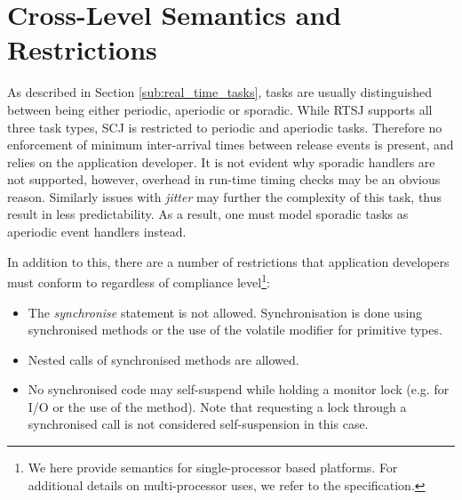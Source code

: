 \section{Cross-Level Semantics and Restrictions} %
\label{sub:cross_level_restrictions}
As described in Section \ref{sub:real_time_tasks}, tasks are usually distinguished between being either periodic, aperiodic or sporadic. While RTSJ supports all three task types, SCJ is restricted to periodic and aperiodic tasks. Therefore no enforcement of minimum inter-arrival times between release events is present, and relies on the application developer. It is not evident why sporadic handlers are not supported, however, overhead in run-time timing checks may be an obvious reason. Similarly issues with \textit{jitter} may further the complexity of this task, thus result in less predictability. As a result, one must model sporadic tasks as aperiodic event handlers instead.

In addition to this, there are a number of restrictions that application developers must conform to regardless of compliance level\footnote{We here provide semantics for single-processor based platforms. For additional details on multi-processor uses, we refer to the specification.}:
\begin{itemize}
	\item The \textit{synchronise} statement is not allowed. Synchronisation is done using synchronised methods or the use of the volatile modifier for primitive types.
	\item Nested calls of synchronised methods are allowed.
	\item No synchronised code may self-suspend while holding a monitor lock (e.g. for I/O or the use of the  method). Note that requesting a lock through a synchronised call is not considered self-suspension in this case.
\end{itemize}

